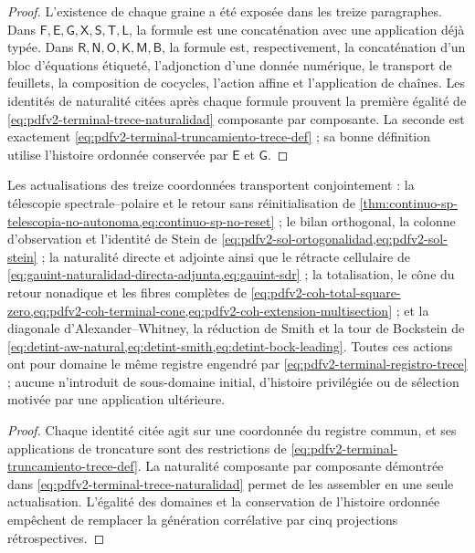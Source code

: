 \begin{proof}
L'existence de chaque graine a été exposée dans les treize paragraphes. Dans \(\mathsf F,\mathsf E,\mathsf G,\mathsf X,\mathsf S,\mathsf T,\mathsf L\), la formule est une concaténation avec une application déjà typée. Dans \(\mathsf R,\mathsf N,\mathsf O,\mathsf K,\mathsf M,\mathsf B\), la formule est, respectivement, la concaténation d'un bloc d'équations étiqueté, l'adjonction d'une donnée numérique, le transport de feuillets, la composition de cocycles, l'action affine et l'application de chaînes. Les identités de naturalité citées après chaque formule prouvent la première égalité de \eqref{eq:pdfv2-terminal-trece-naturalidad} composante par composante. La seconde est exactement \eqref{eq:pdfv2-terminal-truncamiento-trece-def} ; sa bonne définition utilise l'histoire ordonnée conservée par \(\mathsf E\) et \(\mathsf G\).
\end{proof}

\begin{proposition}
\label{prop:pdfv2-terminal-cinco-desarrollos-integrales}
Les actualisations des treize coordonnées transportent conjointement : la télescopie spectrale--polaire et le retour sans réinitialisation de \cref{thm:continuo-sp-telescopia-no-autonoma,eq:continuo-sp-no-reset} ; le bilan orthogonal, la colonne d'observation et l'identité de Stein de \cref{eq:pdfv2-sol-ortogonalidad,eq:pdfv2-sol-stein} ; la naturalité directe et adjointe ainsi que le rétracte cellulaire de \cref{eq:gauint-naturalidad-directa-adjunta,eq:gauint-sdr} ; la totalisation, le cône du retour nonadique et les fibres complètes de \cref{eq:pdfv2-coh-total-square-zero,eq:pdfv2-coh-terminal-cone,eq:pdfv2-coh-extension-multisection} ; et la diagonale d'Alexander--Whitney, la réduction de Smith et la tour de Bockstein de \cref{eq:detint-aw-natural,eq:detint-smith,eq:detint-bock-leading}. Toutes ces actions ont pour domaine le même registre engendré par \eqref{eq:pdfv2-terminal-registro-trece} ; aucune n'introduit de sous-domaine initial, d'histoire privilégiée ou de sélection motivée par une application ultérieure.
\end{proposition}

\begin{proof}
Chaque identité citée agit sur une coordonnée du registre commun, et ses applications de troncature sont des restrictions de \eqref{eq:pdfv2-terminal-truncamiento-trece-def}. La naturalité composante par composante démontrée dans \eqref{eq:pdfv2-terminal-trece-naturalidad} permet de les assembler en une seule actualisation. L'égalité des domaines et la conservation de l'histoire ordonnée empêchent de remplacer la génération corrélative par cinq projections rétrospectives.
\end{proof}

